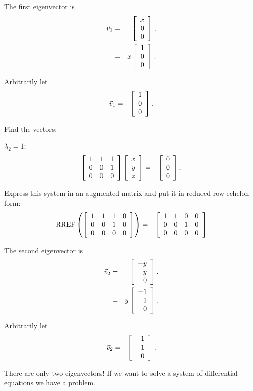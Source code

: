 \begin{frame}
  The first eigenvector is 
  \begin{eqnarray*}
    \vec{v}_1 & = & \left[ \begin{array}{r} x \\ 0 \\ 0 \end{array} \right], \\
    & = & x \left[ \begin{array}{r} 1 \\ 0 \\ 0 \end{array} \right].
  \end{eqnarray*}

  Arbitrarily let
  \begin{eqnarray*}
    \vec{v}_1 & = & \left[ \begin{array}{r} 1 \\ 0 \\ 0 \end{array} \right].
  \end{eqnarray*}

\end{frame}

\begin{frame}
  Find the vectors:

  $\lambda_2 = 1$:
  \begin{eqnarray*}
    \left[ \begin{array}{rrr} 1 & 1 & 1 \\ 0 & 0 & 1 \\ 0 & 0 & 0 \end{array} \right]
    \left[ \begin{array}{r} x \\ y \\ z \end{array} \right] & = & \left[ \begin{array}{r} 0 \\ 0 \\ 0 \end{array} \right], \\
  \end{eqnarray*}

  Express this system in an augmented matrix and put it in reduced row
  echelon form:
  \begin{eqnarray*}
    \mathrm{RREF}\left(\left[ \begin{array}{rrrr}
    1 & 1 & 1 & 0 \\  
    0 & 0 & 1 & 0 \\ 
    0 & 0 & 0 & 0 \\ 
    \end{array} \right]
  \right)
    & = & 
    \left[ \begin{array}{rrrr}
    1 & 1 & 0 & 0 \\  
    0 & 0 & 1 & 0 \\ 
    0 & 0 & 0 & 0 \\ 
    \end{array} \right]
  \end{eqnarray*}

\end{frame}

\begin{frame}

  The second eigenvector is 
  \begin{eqnarray*}
    \vec{v}_2 & = & \left[ \begin{array}{r} -y \\ y \\ 0 \end{array} \right], \\
    & = & y \left[ \begin{array}{r} -1 \\ 1 \\ 0 \end{array} \right].
  \end{eqnarray*}

  Arbitrarily let
  \begin{eqnarray*}
    \vec{v}_2 & = & \left[ \begin{array}{r} -1 \\ 1 \\ 0 \end{array} \right].
  \end{eqnarray*}

  There are only two eigenvectors! If we want to solve a system of
  differential equations we have a problem.

\end{frame}

